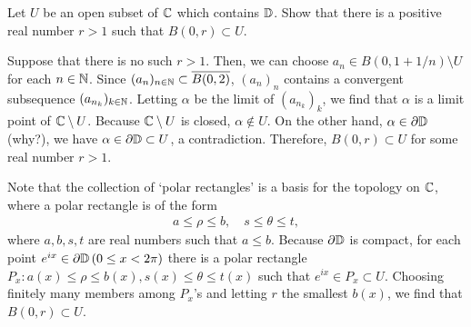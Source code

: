 \begin{prob}
    Let $U$ be an open subset of ${\mathbb{C}}$ which contains ${\mathbb{D}}$.
    Show that there is a positive real number $r>1$ such that $B(0, r)\subset U$.
\end{prob}
\begin{sol}
    Suppose that there is no such $r>1$.
    Then, we can choose $a_n\in B(0, 1+1/n)\setminus U$ for each $n\in{\mathbb{N}}$.
    Since $(a_n)_{n\in{\mathbb{N}}}\subset\overline{B(0, 2)}$, $(a_n)_n$ contains a convergent subsequence $(a_{n_k})_{k\in{\mathbb{N}}}$.
    Letting $\alpha$ be the limit of $(a_{n_k})_k$, we find that $\alpha$ is a limit point of ${\mathbb{C}}\setminus U$.
    Because ${\mathbb{C}}\setminus U$ is closed, $\alpha\notin U$.
    On the other hand, $\alpha\in\partial{\mathbb{D}}$ \color{brown}(why?)\color{black}, we have $\alpha\in\partial{\mathbb{D}}\subset U$, a contradiction.
    Therefore, $B(0, r)\subset U$ for some real number $r>1$.
\end{sol}
\begin{sol}
    Note that the collection of `polar rectangles' is a basis for the topology on ${\mathbb{C}}$, where a polar rectangle is of the form
    \begin{align*}
        a\leq \rho\leq b,\quad s\leq \theta\leq t,
    \end{align*}
    where $a, b, s, t$ are real numbers such that $a\leq b$.
    Because $\partial{\mathbb{D}}$ is compact, for each point $e^{ix}\in\partial{\mathbb{D}}\,(0\leq x<2\pi)$ there is a polar rectangle $P_x: a(x)\leq \rho\leq b(x), s(x)\leq \theta\leq t(x)$ such that $e^{ix}\in P_x\subset U$.
    Choosing finitely many members among $P_x$'s and letting $r$ the smallest $b(x)$, we find that $B(0, r)\subset U$.
\end{sol}